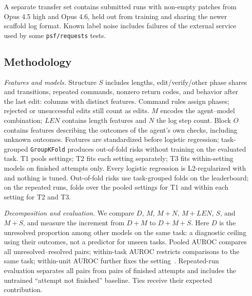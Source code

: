 A separate transfer set contains  submitted runs with non-empty patches from Opus 4.5 high and Opus 4.6, held out from training and sharing the newer scaffold log format. Known label noise includes failures of the external service used by some \texttt{psf/requests} tests.

\subsection{Methodology}
\label{sec:methodology}

\emph{Features and models.} Structure $S$ includes lengths, edit/verify/other phase shares and transitions, repeated commands, nonzero return codes, and behavior after the last edit:  columns with  distinct features. Command rules assign phases; rejected or unsuccessful edits still count as edits. $M$ encodes the agent--model combination; $LEN$ contains length features and $N$ the log step count. Block $O$ contains  features describing the outcomes of the agent's own checks, including unknown outcomes. Features are standardized before logistic regression; task-grouped \texttt{GroupKFold} produces out-of-fold risks without training on the evaluated task. T1 pools settings; T2 fits each setting separately; T3 fits within-setting models on finished attempts only. Every logistic regression is L2-regularized with  and nothing is tuned.
Out-of-fold risks use  task-grouped folds on the leaderboard; on the repeated runs,  folds over the pooled settings for T1 and  within each setting for T2 and T3.

\emph{Decomposition and evaluation.} We compare $D$, $M$, $M+N$, $M+LEN$, $S$, and $M+S$, and measure the increment from $D+M$ to $D+M+S$. Here $D$ is the unresolved proportion among other models on the same task: a diagnostic ceiling using their outcomes, not a predictor for unseen tasks. Pooled AUROC compares all unresolved--resolved pairs; within-task AUROC restricts comparisons to the same task; within-unit AUROC further fixes the setting~\cite{esfandyaridoulabi2026disentangling}. Repeated-run evaluation separates all pairs from pairs of finished attempts and includes the untrained ``attempt not finished'' baseline. Ties receive their expected contribution.


